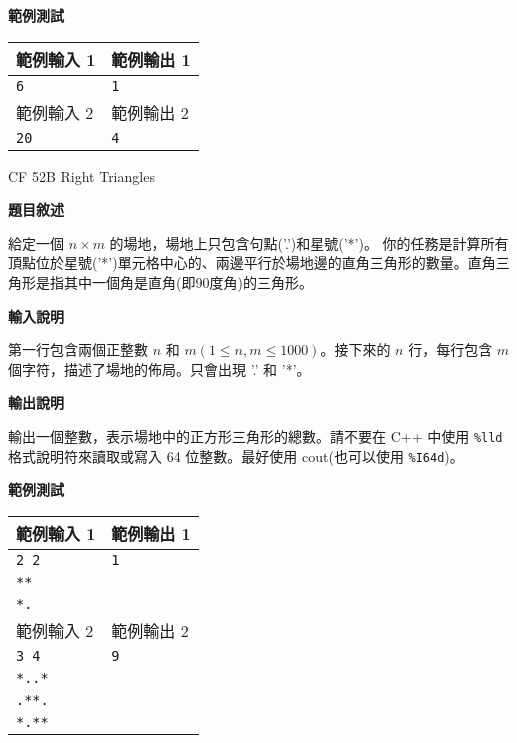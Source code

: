     \textbf{範例測試}

    \begin{tabular}{|m{7cm}|m{7cm}|}
        \hline
        範例輸入 1 & 範例輸出 1 \\
        \hline
        \verb|6| & \verb|1| \\
        \hline
        範例輸入 2 & 範例輸出 2 \\
        \hline
        \verb|20| & \verb|4| \\
        \hline
    \end{tabular}

    \problem CF 52B Right Triangles
    
    \textbf{題目敘述}

    給定一個 $n \times m$ 的場地，場地上只包含句點('.')和星號('*')。
    你的任務是計算所有頂點位於星號('*')單元格中心的、兩邊平行於場地邊的直角三角形的數量。直角三角形是指其中一個角是直角(即90度角)的三角形。

    \textbf{輸入說明}

    第一行包含兩個正整數 $n$ 和 $m(1 \le n, m \le 1000)$。接下來的 $n$ 行，每行包含 $m$ 個字符，描述了場地的佈局。只會出現 '.' 和 '*'。

    \textbf{輸出說明}

    輸出一個整數，表示場地中的正方形三角形的總數。請不要在 C++ 中使用 \verb|%lld| 格式說明符來讀取或寫入 64 位整數。最好使用 cout(也可以使用 \verb|%I64d|)。

    \textbf{範例測試}

    \begin{tabular}{|m{7cm}|m{7cm}|}
        \hline
        範例輸入 1 & 範例輸出 1 \\
        \hline
        \verb|2 2| & \verb|1| \\
        \verb|**| &\\
        \verb|*.| & \\
        \hline
        範例輸入 2 & 範例輸出 2 \\
        \hline
        \verb|3 4| & \verb|9| \\
        \verb|*..*| &\\
        \verb|.**.| & \\
        \verb|*.**| &\\
        \hline
    \end{tabular}